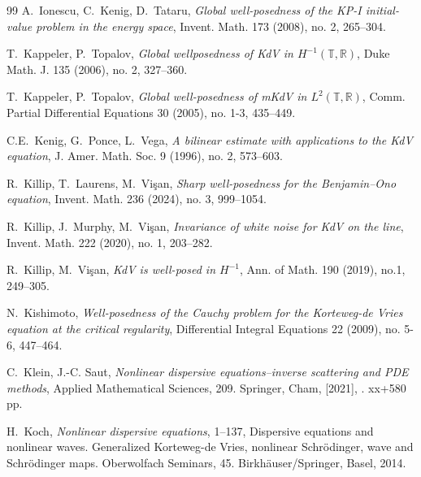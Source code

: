 \documentclass[letterpaper, 11pt,  reqno]{amsart}
\newcommand{\1}{\hspace{0.5mm}\text{I}\hspace{0.5mm}}
\newcommand{\R}{\mathbb{R}}
\newcommand{\T}{\mathbb{T}}
\numberwithin{equation}{section}
\numberwithin{theorem}{section}
\begin{document}
\begin{thebibliography}{99}
A.~Ionescu, C.~Kenig, D.~Tataru, 
{\it Global well-posedness of the KP-I initial-value problem in the energy space}, 
Invent. Math. 173 (2008), no. 2, 265--304.




T.~Kappeler, P.~Topalov,
{\it Global wellposedness of KdV in $H^{-1}(\T, \R)$},
Duke Math. J. 135 (2006), no. 2, 327--360.


T.~Kappeler, P.~Topalov,
{\it Global well-posedness of mKdV in $L^2(\T,\R)$}, 
Comm. Partial Differential Equations 30 (2005), no. 1-3, 435--449. 


%
%
%




C.E.~Kenig, G.~Ponce, L.~Vega,
{\it A bilinear estimate with applications to the KdV equation},
J. Amer. Math. Soc. 9 (1996), no. 2, 573--603.






R.~Killip, T.~Laurens, M.~Vi\c{s}an, 
{\it Sharp well-posedness for the Benjamin--Ono equation}, 
Invent. Math. 236 (2024), no. 3, 999--1054.



R.~Killip, J.~Murphy,  M.~Vi\c{s}an, 
{\it  Invariance of white noise for KdV on the line}, Invent. Math. 222 (2020), no. 1, 203--282.


R.~Killip, M.~Vi\c{s}an, 
{\it KdV is well-posed in $H^{-1}$}, 
Ann. of Math. 190 (2019), no.1, 249--305.


N.~Kishimoto,
{\it Well-posedness of the Cauchy problem for the Korteweg-de Vries equation at the critical regularity},
Differential Integral Equations 22 (2009), no. 5-6, 447--464.



C.~Klein, J.-C. Saut, 
{\it Nonlinear dispersive equations--inverse scattering and PDE methods}, 
Applied Mathematical Sciences, 209. Springer, Cham, [2021], . xx+580 pp.



H.~Koch, 
{\it Nonlinear dispersive equations}, 1--137, 
Dispersive equations and nonlinear waves. Generalized Korteweg-de Vries, nonlinear Schr\"odinger, wave and Schr\"odinger maps. Oberwolfach Seminars, 45. Birkh\"auser/Springer, Basel, 2014. 


\end{thebibliography}
\end{document}

